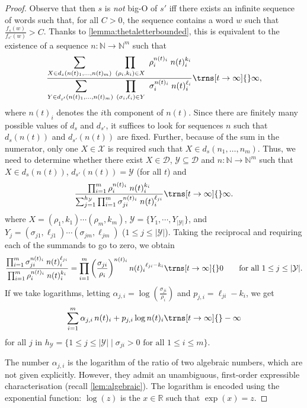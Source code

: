 \documentclass[10pt,a4paper]{amsart}
\numberwithin{equation}{section}
\theoremstyle{plain}
\theoremstyle{definition}
\theoremstyle{remark}
\newcommand\dgf{d}
\newcommand\adm{\mathcal{D}}
\renewcommand\nu{f}
\begin{document}
\begin{proof}
Observe that then $s$ is \emph{not} big-O of $s'$ iff there exists an infinite sequence of words such that, for  all $C >0$,
the sequence contains a word $w$ such that $\frac{\nu_s(w)}{\nu_{s'}(w)} > C$.
Thanks to \cref{lemma:thetaletterbounded}, this is equivalent to the existence of  a sequence $n : \mathbb{N} \to \mathbb{N}^m$ such that \begin{equation*}
\frac{\displaystyle\sum_{X\in \dgf_{s}(n(t)_1,\dots, n(t)_m)} \; \prod_{(\rho_i,k_i) \in X} \  \rho_i^{n(t)_i}\; n(t)_i^{k_i}}{\displaystyle\sum_{Y\in \dgf_{s'}(n(t)_1,\dots, n(t)_m) \;}\prod_{(\sigma_i,\ell_i) \in Y} \  \sigma_i^{n(t)_i}\; n(t)_i^{\ell_i}} \trns[t\to\infty]{} \infty,
\end{equation*}
where $n(t)_i$ denotes  the $i$th component of $n(t)$.
Since there are finitely many possible values of $\dgf_s$ and $\dgf_{s'}$, it suffices to look for sequences $n$ such that $\dgf_s(n(t))$ and $\dgf_{s'}(n(t))$ are fixed.
Further, because of the sum in the numerator, only one $X \in \mathcal{X}$ is required such that $X \in \dgf_s(n_1,\dots,n_m)$.
Thus, we need to determine
whether there exist $X\in\adm$, $\mathcal{Y}\subseteq \adm$ and $n: \mathbb{N} \to \mathbb{N}^m$
such that $X \in \dgf_s(n(t))$, $\dgf_{s'}(n(t)) =\mathcal{Y}$ (for all $t$) and
\begin{equation*}
\frac{\prod_{i=1}^m \rho_i^{n(t)_i}\; n(t)_i^{k_i}}{\sum_{j=1}^{h_\mathcal{Y}} \prod_{i=1}^m \sigma_{ji}^{n(t)_i}\; n(t)_i^{\ell_{ji}}} \trns[t\to\infty]{} \infty.
\end{equation*}
where $X = (\rho_1, k_1)\cdots (\rho_m, k_m)$,
$\mathcal{Y} = \{ Y_1,\cdots, Y_{|\mathcal{Y}|} \}$, and $Y_j= (\sigma_{j1},\ell_{j1})\cdots(\sigma_{jm},\ell_{jm})$ ($1\le j\le |\mathcal{Y}|$).
Taking the reciprocal and requiring each of the summands to go to zero, we obtain
\[
\frac{\prod_{i=1}^m \sigma_{ji}^{n(t)_i}\; n(t)_i^{\ell_{ji}}}{\prod_{i=1}^m \rho_i^{n(t)_i} \; n(t)_i^{k_i}}= \prod_{i = 1}^m\left(\frac{\sigma_{ji}}{\rho_i}\right)^{{n(t)_i}} {n(t)_i}^{\ell_{ji} - k_i }  \trns[t\to\infty]{} 0
\qquad \text{for all $1\le j\le |\mathcal{Y}|$.}
\]
If we take  logarithms, letting $\alpha_{j,i} = \log(\frac{\sigma_{ji}}{\rho_i})$ and $p_{j,i} = \ell_{ji} - k_i$, we get
\[
\sum_{i = 1}^m \alpha_{j,i} \,n(t)_i +  p_{j,i}\log n(t)_i \trns[t\to\infty]{} -\infty\] for all $j $ in $h_\mathcal{Y}= \{ 1\le j \le |\mathcal{Y}| \mid  \sigma_{ji} >0 \text{ for all }  1\le i\le m \}.$

The number $\alpha_{j,i}$ is the logarithm of the ratio of two algebraic numbers, which are not given explicitly. However, they admit an unambiguous, first-order expressible characterisation (recall \cref{lem:algebraic}). The logarithm is encoded using the exponential function: $\log(z)$ is the $x \in \mathbb{R}$ such that $\exp(x) = z$.
\end{proof}
\end{document}
